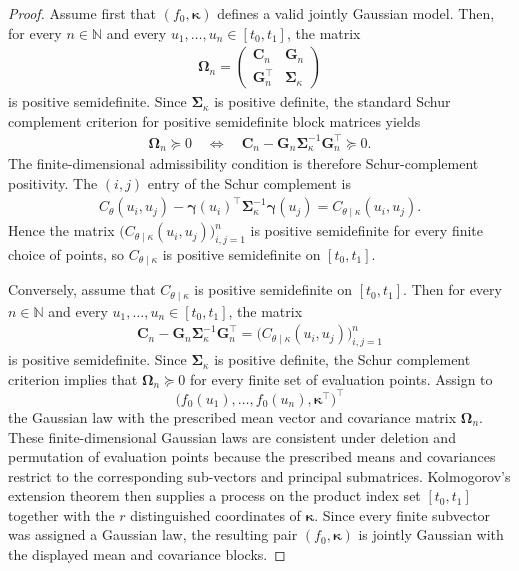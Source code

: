 \documentclass[10pt,a4paper]{amsart}
\begin{document}
\begin{proof}
Assume first that $(f_0,\boldsymbol{\kappa})$ defines a valid jointly Gaussian model. Then, for every $n\in\mathbb{N}$ and every $u_1,\ldots,u_n\in[t_0,t_1]$, the matrix
\begin{align*}
\boldsymbol{\Omega}_n=
\begin{pmatrix}
\mathbf{C}_n & \mathbf{G}_n\\
\mathbf{G}_n^\top & \boldsymbol{\Sigma}_{\kappa}
\end{pmatrix}
\end{align*}
is positive semidefinite. Since $\boldsymbol{\Sigma}_{\kappa}$ is positive definite, the standard Schur complement criterion for positive semidefinite block matrices yields
\begin{align*}
\boldsymbol{\Omega}_n\succeq 0
\quad\Longleftrightarrow\quad
\mathbf{C}_n-\mathbf{G}_n\boldsymbol{\Sigma}_{\kappa}^{-1}\mathbf{G}_n^\top\succeq 0.
\end{align*}
The finite-dimensional admissibility condition is therefore Schur-complement positivity.
The $(i,j)$ entry of the Schur complement is
\begin{align*}
C_\theta(u_i,u_j)-\boldsymbol{\gamma}(u_i)^\top\boldsymbol{\Sigma}_{\kappa}^{-1}\boldsymbol{\gamma}(u_j)
=
C_{\theta\mid\kappa}(u_i,u_j).
\end{align*}
Hence the matrix $\bigl(C_{\theta\mid\kappa}(u_i,u_j)\bigr)_{i,j=1}^n$ is positive semidefinite for every finite choice of points, so $C_{\theta\mid\kappa}$ is positive semidefinite on $[t_0,t_1]$.

Conversely, assume that $C_{\theta\mid\kappa}$ is positive semidefinite on $[t_0,t_1]$. Then for every $n\in\mathbb{N}$ and every $u_1,\ldots,u_n\in[t_0,t_1]$, the matrix
\begin{align*}
\mathbf{C}_n-\mathbf{G}_n\boldsymbol{\Sigma}_{\kappa}^{-1}\mathbf{G}_n^\top
=
\bigl(C_{\theta\mid\kappa}(u_i,u_j)\bigr)_{i,j=1}^n
\end{align*}
is positive semidefinite. Since $\boldsymbol{\Sigma}_{\kappa}$ is positive definite, the Schur complement criterion implies that $\boldsymbol{\Omega}_n\succeq 0$ for every finite set of evaluation points. Assign to
\[
\bigl(f_0(u_1),\ldots,f_0(u_n),\boldsymbol{\kappa}^\top\bigr)^\top
\]
the Gaussian law with the prescribed mean vector and covariance matrix $\boldsymbol{\Omega}_n$. These finite-dimensional Gaussian laws are consistent under deletion and permutation of evaluation points because the prescribed means and covariances restrict to the corresponding sub-vectors and principal submatrices. Kolmogorov's extension theorem then supplies a process on the product index set \([t_0,t_1]\) together with the \(r\) distinguished coordinates of \(\boldsymbol{\kappa}\). Since every finite subvector was assigned a Gaussian law, the resulting pair \((f_0,\boldsymbol{\kappa})\) is jointly Gaussian with the displayed mean and covariance blocks.
\end{proof}
\end{document}
